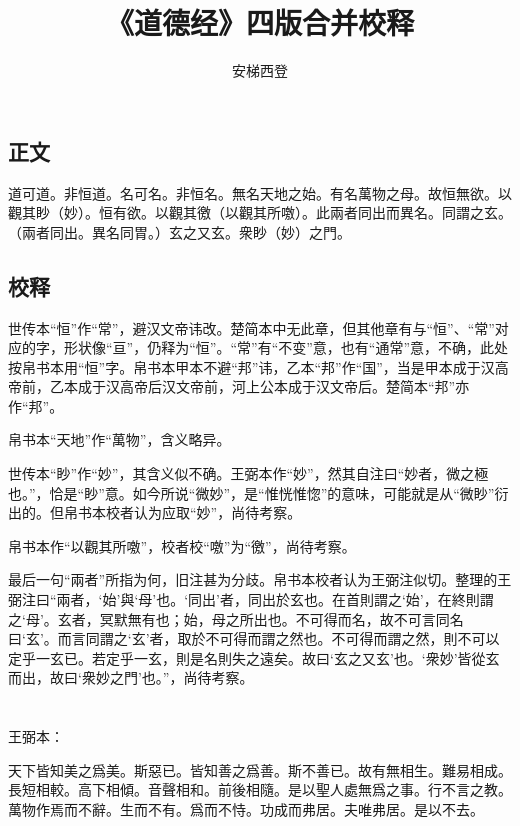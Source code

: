 \documentclass[a5paper]{ctexbook}
\title{《道德经》四版合并校释}
\author{安梯西登}
\date{}
\begin{document}
    \maketitle

    \tableofcontents

    \chapter{}
    \section*{正文}
    道可道。非恒道。名可名。非恒名。無名天地之始。有名萬物之母。故恒無欲。以觀其眇（妙）。恒有欲。以觀其徼（以觀其所噭）。此兩者同出而異名。同謂之玄。（兩者同出。異名同胃。）玄之又玄。衆眇（妙）之門。
    \section*{校释}
    世传本“恒”作“常”，避汉文帝讳改。楚简本中无此章，但其他章有与“恒”、“常”对应的字，形状像“亘”，仍释为“恒”。“常”有“不变”意，也有“通常”意，不确，此处按帛书本用“恒”字。帛书本甲本不避“邦”讳，乙本“邦”作“国”，当是甲本成于汉高帝前，乙本成于汉高帝后汉文帝前，河上公本成于汉文帝后。楚简本“邦”亦作“邦”。

    帛书本“天地”作“萬物”，含义略异。

    世传本“眇”作“妙”，其含义似不确。王弼本作“妙”，然其自注曰“妙者，微之極也。”，恰是“眇”意。如今所说“微妙”，是“惟恍惟惚”的意味，可能就是从“微眇”衍出的。但帛书本校者认为应取“妙”，尚待考察。

    帛书本作“以觀其所噭”，校者校“噭”为“徼”，尚待考察。

    最后一句“兩者”所指为何，旧注甚为分歧。帛书本校者认为王弼注似切。整理的王弼注曰“兩者，‘始’與‘母’也。‘同出’者，同出於玄也。在首則謂之‘始’，在終則謂之‘母’。玄者，冥默無有也；始，母之所出也。不可得而名，故不可言同名曰‘玄’。而言同謂之‘玄’者，取於不可得而謂之然也。不可得而謂之然，則不可以定乎一玄已。若定乎一玄，則是名則失之遠矣。故曰‘玄之又玄’也。‘衆妙’皆從玄而出，故曰‘衆妙之門’也。”，尚待考察。
    \chapter{}
    王弼本：

    天下皆知美之爲美。斯惡已。皆知善之爲善。斯不善已。故有無相生。難易相成。長短相較。高下相傾。音聲相和。前後相隨。是以聖人處無爲之事。行不言之教。萬物作焉而不辭。生而不有。爲而不恃。功成而弗居。夫唯弗居。是以不去。
\end{document}
